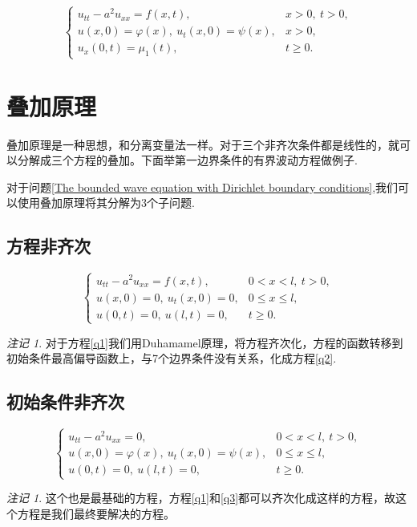 \documentclass[12pt,a4paper]{article}
\numberwithin{subsection}{section}   %
\numberwithin{subsubsection}{subsection}
\theoremstyle{plain}
\theoremstyle{definition}
\theoremstyle{remark}
\newtheorem{remark}[theorem]{注记}
\theoremstyle{remark}
\begin{document}
	\begin{equation}\label{The unbounded wave equation}
		\begin{cases}
			u_{tt} - a^2 u_{xx} = f(x, t), &  x > 0, \ t > 0, \\
			u(x, 0) = \varphi(x), \ u_t(x, 0) = \psi(x), & x > 0, \\
			u_x(0, t) = \mu_1(t), & t \geq 0.
		\end{cases}
	\end{equation}
	
	
	
		\newpage
	\section{叠加原理}
	叠加原理是一种思想，和分离变量法一样。对于三个非齐次条件都是线性的，就可以分解成三个方程的叠加。下面举第一边界条件的有界波动方程做例子.
	
	对于问题\eqref{The bounded wave equation with Dirichlet boundary conditions},我们可以使用叠加原理将其分解为3个子问题.
		\subsection{方程非齐次}
				\begin{equation}\label{q1}
		\begin{cases}
			u_{tt} - a^2 u_{xx} = f(x, t), & 0 < x < l, \ t > 0, \\
			u(x, 0) = 0, \ u_t(x, 0) = 0, & 0 \leq x \leq l, \\
			u(0, t) = 0, \ u(l, t) = 0, & t \geq 0.
		\end{cases}
	\end{equation}
	\begin{remark}
	对于方程\eqref{q1}我们用Duhamamel原理，将方程齐次化，方程的函数转移到初始条件最高偏导函数上，与7个边界条件没有关系，化成方程\eqref{q2}.
	\end{remark}
		
	\subsection{初始条件非齐次}
		\begin{equation}\label{q2}
			\begin{cases}
				u_{tt} - a^2 u_{xx} = 0, & 0 < x < l, \ t > 0, \\
				u(x, 0) = \varphi(x), \ u_t(x, 0) = \psi(x), & 0 \leq x \leq l, \\
				u(0, t) = 0, \ u(l, t) = 0, & t \geq 0.
			\end{cases}
		\end{equation}
\begin{remark}
	这个也是最基础的方程，方程\eqref{q1}和\eqref{q3}都可以齐次化成这样的方程，故这个方程是我们最终要解决的方程。
\end{remark}
	
\end{document}
